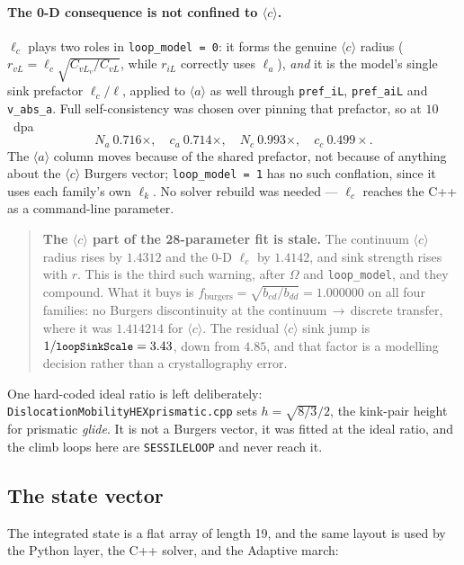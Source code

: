 \documentclass[11pt]{article}
\newcommand{\aloop}{\ensuremath{\langle a\rangle}}
\newcommand{\cloop}{\ensuremath{\langle c\rangle}}
\newcommand{\code}[1]{\texttt{\small #1}}
\begin{document}
\paragraph{The 0-D consequence is not confined to \cloop{}.} $\ell_c$ plays two
roles in \code{loop\_model = 0}: it forms the genuine \cloop{} radius
($r_{vL} = \ell_c\sqrt{C_{vL_v}/C_{vL}}$, while $r_{iL}$ correctly uses
$\ell_a$), \emph{and} it is the model's single sink prefactor $\ell_c/\ell$,
applied to \aloop{} as well through \code{pref\_iL}, \code{pref\_aiL} and
\code{v\_abs\_a}. Full self-consistency was chosen over pinning that prefactor,
so at $10$~dpa
\[
N_a\ 0.716\times,\quad c_a\ 0.714\times,\quad
N_c\ 0.993\times,\quad c_c\ 0.499\times .
\]
The \aloop{} column moves because of the shared prefactor, not because of
anything about the \cloop{} Burgers vector; \code{loop\_model = 1} has no such
conflation, since it uses each family's own $\ell_k$. No solver rebuild was
needed --- $\ell_c$ reaches the C++ as a command-line parameter.

\begin{quote}
\textbf{The \cloop{} part of the 28-parameter fit is stale.} The continuum
\cloop{} radius rises by $1.4312$ and the 0-D $\ell_c$ by $1.4142$, and sink
strength rises with $r$. This is the third such warning, after $\Omega$ and
\code{loop\_model}, and they compound. What it buys is
$f_{\text{burgers}} = \sqrt{b_{cd}/b_{dd}} = 1.000000$ on all four families: no
Burgers discontinuity at the continuum\,$\to$\,discrete transfer, where it was
$1.414214$ for \cloop{}. The residual \cloop{} sink jump is
$1/\code{loopSinkScale} = 3.43$, down from $4.85$, and that factor is a
modelling decision rather than a crystallography error.
\end{quote}

\noindent
One hard-coded ideal ratio is left deliberately:
\code{DislocationMobilityHEXprismatic.cpp} sets $h = \sqrt{8/3}/2$, the
kink-pair height for prismatic \emph{glide}. It is not a Burgers vector, it was
fitted at the ideal ratio, and the climb loops here are \code{SESSILELOOP} and
never reach it.

\subsection{The state vector}
\label{sec:statevector}

The integrated state is a flat array of length 19, and the same layout is
used by the Python layer, the C++ solver, and the Adaptive march:
\end{document}
